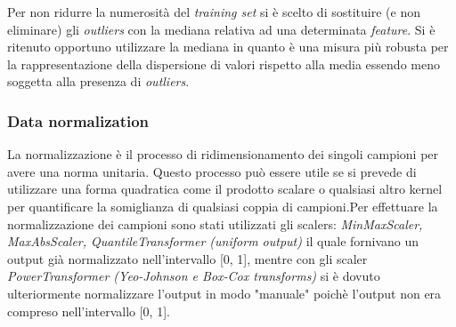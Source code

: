                         Per non ridurre la numerosità del \textit{training set} si è scelto di sostituire (e non eliminare) gli \textit{outliers} con la mediana relativa ad una determinata \textit{feature}. Si è ritenuto opportuno utilizzare la mediana in quanto è una misura più robusta per la rappresentazione della dispersione di valori rispetto alla media essendo meno soggetta alla presenza di \textit{outliers}.                        
                
                \subsubsection{Data normalization}
                
                La normalizzazione è il processo di ridimensionamento dei singoli campioni per avere una norma unitaria. Questo processo può essere utile se si prevede di utilizzare una forma quadratica come il prodotto scalare o qualsiasi altro kernel per quantificare la somiglianza di qualsiasi coppia di campioni.Per effettuare la normalizzazione dei campioni sono stati utilizzati gli scalers: \textit{MinMaxScaler, MaxAbsScaler, QuantileTransformer (uniform output)} il quale fornivano un output già normalizzato nell'intervallo [0, 1], mentre con gli scaler \textit{PowerTransformer (Yeo-Johnson e Box-Cox transforms)} si è dovuto ulteriormente normalizzare l'output in modo "manuale" poichè l'output non era compreso nell'intervallo [0, 1].
                
